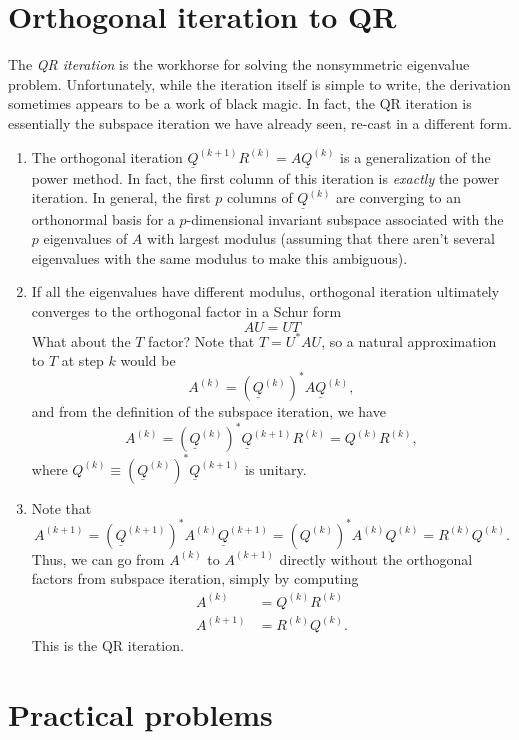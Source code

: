\documentclass[12pt, leqno]{article} %
\newcommand{\uQ}{\underline{Q}}
\begin{document}

\section*{Orthogonal iteration to QR}

The {\em QR iteration} is the workhorse for solving the nonsymmetric
eigenvalue problem.  Unfortunately, while the iteration itself is
simple to write, the derivation sometimes appears to be a work of
black magic.  In fact, the QR iteration is essentially the subspace
iteration we have already seen, re-cast in a different form.

\begin{enumerate}
\item
  The orthogonal iteration $\uQ^{(k+1)} R^{(k)} = A \uQ^{(k)}$ is a
  generalization of the power method.  In fact, the first column of
  this iteration is {\em exactly} the power iteration.  In general,
  the first $p$ columns of $\uQ^{(k)}$ are converging to an orthonormal
  basis for a $p$-dimensional invariant subspace associated with the
  $p$ eigenvalues of $A$ with largest modulus (assuming that there
  aren't several eigenvalues with the same modulus to make this
  ambiguous).
\item
  If all the eigenvalues have different modulus, orthogonal iteration
  ultimately converges to the orthogonal factor in a Schur form
  \[
    AU = UT
  \]
  What about the $T$ factor?  Note that $T = U^* A U$, so a natural
  approximation to $T$ at step $k$ would be 
  \[
    A^{(k)} = (\uQ^{(k)})^* A \uQ^{(k)},
  \]
  and from the definition of the subspace iteration, we have
  \[
    A^{(k)} = (\uQ^{(k)})^* \uQ^{(k+1)} R^{(k)} = Q^{(k)} R^{(k)},
  \]
  where $Q^{(k)} \equiv (\uQ^{(k)})^* \uQ^{(k+1)}$ is unitary.
\item
  Note that
  \[
    A^{(k+1)} 
    = (\uQ^{(k+1)})^* A^{(k)} \uQ^{(k+1)} 
    = (Q^{(k)})^* A^{(k)} Q^{(k)}
    = R^{(k)} Q^{(k)}.
  \]
  Thus, we can go from $A^{(k)}$ to $A^{(k+1)}$ directly without
  the orthogonal factors from subspace iteration, simply by computing
  \begin{align*}
    A^{(k)} &= Q^{(k)} R^{(k)} \\
    A^{(k+1)} &= R^{(k)} Q^{(k)}.
  \end{align*}
  This is the QR iteration.
\end{enumerate}

\section*{Practical problems}
\end{document}
